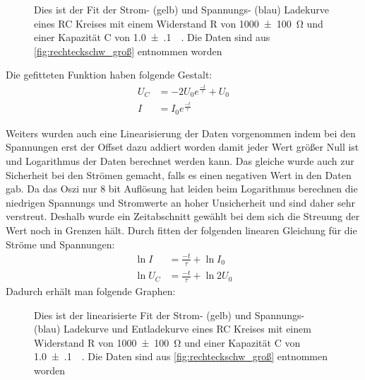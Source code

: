 \documentclass[11pt,ngerman]{scrartcl}
\begin{document}
\begin{figure}
	\begin{center}
	\end{center}
	\caption{Dies ist der Fit der Strom- (gelb) und Spannungs- (blau) Ladekurve eines RC Kreises mit einem
		Widerstand R von \SI{1000(100)}{\ohm} und einer Kapazität C von
		\SI{1.0(1)}{\micro\Farad}. Die Daten sind aus \autoref{fig:rechteckschw_groß}
		entnommen worden}
	\label{fig:ladekurve}
\end{figure}
Die gefitteten Funktion haben folgende Gestalt:
\begin{align*}
	U_C & = -2U_0 e^{\frac{-t}{\tau}} + U_0 \\
	I   & = I_0 e^{\frac{-t}{\tau}}
\end{align*}

Weiters wurden auch eine Linearisierung der Daten vorgenommen indem bei den
Spannungen erst der Offset dazu addiert worden damit jeder Wert größer Null
ist und Logarithmus der Daten berechnet werden kann. Das gleiche wurde auch zur
Sicherheit bei den Strömen gemacht, falls es einen negativen Wert in den Daten gab.
Da das Oszi nur 8 bit Auflösung hat leiden beim Logarithmus berechnen die niedrigen
Spannungs und Stromwerte an hoher Unsicherheit und sind daher sehr verstreut. Deshalb
wurde ein Zeitabschnitt gewählt bei dem sich die Streuung der Wert noch in Grenzen hält.
Durch fitten der folgenden linearen Gleichung für die Ströme und Spannungen:
\begin{align*}
	\ln{I}   & = \frac{-t}{\tau} + \ln{I_0}  \\
	\ln{U_C} & = \frac{-t}{\tau} + \ln{2U_0}
\end{align*}
Dadurch erhält man folgende Graphen:

\begin{figure}
	\centering
	\begin{minipage}{0.45\textwidth}%
	\end{minipage}%
	\qquad
	\begin{minipage}{0.45\textwidth}%
	\end{minipage}%
	\caption{Dies ist der linearisierte Fit der Strom- (gelb) und Spannungs-
		(blau) Ladekurve und Entladekurve eines RC Kreises mit einem Widerstand R
		von \SI{1000(100)}{\ohm} und einer Kapazität C von
		\SI{1.0(1)}{\micro\Farad}. Die Daten sind aus
		\autoref{fig:rechteckschw_groß} entnommen worden}
	\label{fig:linear_fit}
\end{figure}
\end{document}
